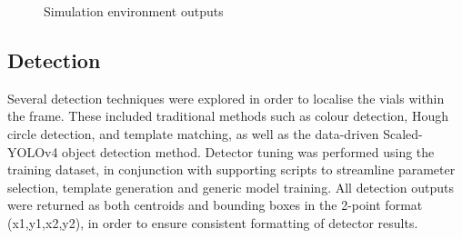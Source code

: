 \documentclass[10pt]{article}
\begin{document}
\vfill
\begin{figure}[hbt]%
    \centering
    \qquad %
    \caption{Simulation environment outputs}
    \label{fig:simulation_output}%
\end{figure}
\vfill

\subsection{Detection}
Several detection techniques were explored in order to localise the vials within the frame. These included traditional methods such as colour detection, Hough circle detection, and template matching, as well as the data-driven Scaled-YOLOv4 object detection method. Detector tuning was performed using the training dataset, in conjunction with supporting scripts to streamline parameter selection, template generation and generic model training. All detection outputs were returned as both centroids and bounding boxes in the 2-point format (x1,y1,x2,y2), in order to ensure consistent formatting of detector results.
\end{document}
